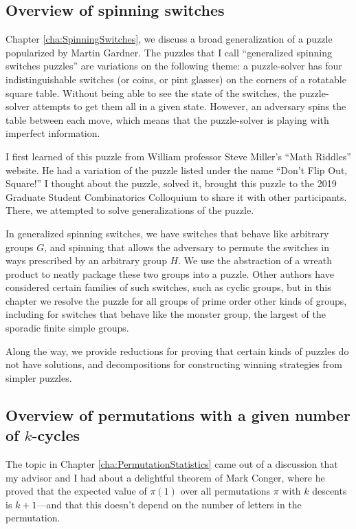 \subsection{Overview of spinning switches}
Chapter \ref{cha:SpinningSwitches}, we discuss a broad generalization of a
puzzle popularized by Martin Gardner. The puzzles that I call
``generalized spinning switches puzzles'' are variations on the following theme:
a puzzle-solver has four indistinguishable switches (or coins, or pint glasses)
on the corners of a rotatable square table. Without being able to see the state
of the switches, the puzzle-solver attempts to get them all in a given state.
However, an adversary spins the table between each move, which means that the
puzzle-solver is playing with imperfect information.

I first learned of this puzzle from William professor Steve Miller's
``Math Riddles'' website.
He had a variation of the puzzle listed under the name ``Don't Flip Out, Square!''
I thought about the puzzle, solved it, brought this puzzle to the 2019 Graduate
Student Combinatorics Colloquium to share it with other participants. There,
we attempted to solve generalizations of the puzzle.

In generalized spinning switches, we have switches that behave like arbitrary
groups $G$, and spinning that allows the adversary to permute the switches in
ways prescribed by an arbitrary group $H$. We use the abstraction of a wreath
product to neatly package these two groups into a puzzle.
Other authors have considered certain families of such switches, such as cyclic
groups, but in this chapter we resolve the puzzle for all groups of prime order
other kinds of groups, including for switches that behave like the monster
group, the largest of the sporadic finite simple groups.

Along the way, we provide reductions for proving that certain kinds of puzzles
do not have solutions, and decompositions for constructing winning strategies
from simpler puzzles.

\subsection{Overview of permutations with a given number of \texorpdfstring{$k$}{k}-cycles}
The topic in Chapter \ref{cha:PermutationStatistics}
came out of a discussion that my advisor and I had about a delightful
theorem of Mark Conger, where he proved that the expected value of $\pi(1)$
over all permutations $\pi$ with $k$ descents is $k + 1$---and that this doesn't
depend on the number of letters in the permutation.

